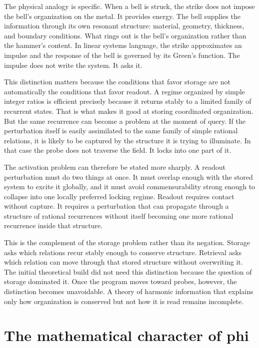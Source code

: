 The physical analogy is specific. When a bell is struck, the strike does not impose the bell's organization on the metal. It provides energy. The bell supplies the information through its own resonant structure: material, geometry, thickness, and boundary conditions. What rings out is the bell's organization rather than the hammer's content. In linear systems language, the strike approximates an impulse and the response of the bell is governed by its Green's function. The impulse does not write the system. It asks it.

This distinction matters because the conditions that favor storage are not automatically the conditions that favor readout. A regime organized by simple integer ratios is efficient precisely because it returns stably to a limited family of recurrent states. That is what makes it good at storing coordinated organization. But the same recurrence can become a problem at the moment of query. If the perturbation itself is easily assimilated to the same family of simple rational relations, it is likely to be captured by the structure it is trying to illuminate. In that case the probe does not traverse the field. It locks into one part of it.

The activation problem can therefore be stated more sharply. A readout perturbation must do two things at once. It must overlap enough with the stored system to excite it globally, and it must avoid commensurability strong enough to collapse into one locally preferred locking regime. Readout requires contact without capture. It requires a perturbation that can propagate through a structure of rational recurrences without itself becoming one more rational recurrence inside that structure.

This is the complement of the storage problem rather than its negation. Storage asks which relations recur stably enough to conserve structure. Retrieval asks which relation can move through that stored structure without overwriting it. The initial theoretical build did not need this distinction because the question of storage dominated it. Once the program moves toward probes, however, the distinction becomes unavoidable. A theory of harmonic information that explains only how organization is conserved but not how it is read remains incomplete.

\section{The mathematical character of phi}

